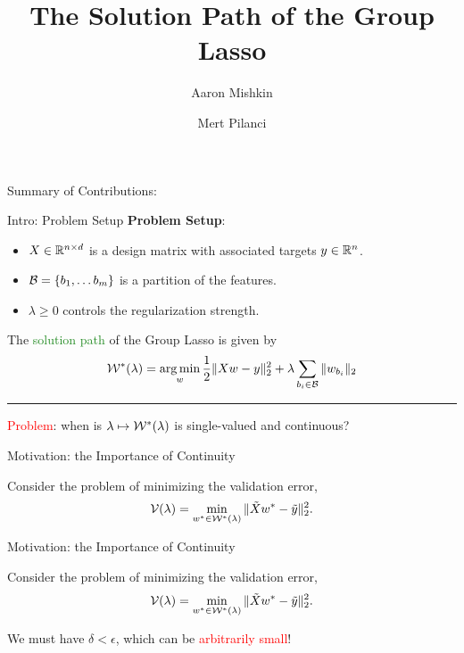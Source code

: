 \documentclass[usenames,dvipsnames,mathserif,notheorems]{beamer}
\title{The Solution Path of the Group Lasso}
\subtitle{}
\author{Aaron Mishkin \and Mert Pilanci}
\institute{Stanford University}
\date{}
\newcommand{\horizontalrule}{
	{
			\vspace{-0.5em}
			\center \rule{\textwidth}{0.1em}
			\vspace{-0.2em}
		}
}
\newcommand{\red}[1]{\textcolor{Red}{#1}}
\newcommand{\green}[1]{\textcolor{ForestGreen}{#1}}
\begin{document}
\maketitle

\begin{frame}{Summary of Contributions:}

\end{frame}


\begin{frame}{Intro: Problem Setup}
	\textbf{Problem Setup}:
	\begin{itemize}
		\item \( X \in \mathbb{R}^{n \times d} \) is a design matrix with associated targets \( y \in \mathbb{R}^n \).
		\item \( \mathcal{B} = \left\{b_1, \ldots b_m\right\} \) is a partition of the features.
		\item \( \lambda \geq 0 \) controls the regularization strength.
	\end{itemize}

	\vspace{0.5em}
	\pause

	The \green{solution path} of the Group Lasso is given by
	\[
		\mathcal{W}^*(\lambda) = \mathop{\rm arg\,min}_{w} \frac 1 2 \|X w - y\|_2^2 + \lambda \sum_{{b_i} \in \mathcal{B}} \|w_{b_i}\|_2
	\]

	\horizontalrule
	\pause

	\red{Problem}: when is \( \lambda \mapsto \mathcal{W}^*(\lambda) \) is single-valued and continuous?

\end{frame}


\begin{frame}{Motivation: the Importance of Continuity}

	Consider the problem of minimizing the validation error,
	\[
		\mathcal{V}(\lambda) = \min_{w^* \in \mathcal{W}^*(\lambda)} \|\tilde X w^* - \tilde y\|_2^2.
	\]

	\pause

	\begin{figure}[]
		\centering
		
	\end{figure}

\end{frame}

\begin{frame}{Motivation: the Importance of Continuity}

	Consider the problem of minimizing the validation error,
	\[
		\mathcal{V}(\lambda) = \min_{w^* \in \mathcal{W}^*(\lambda)} \|\tilde X w^* - \tilde y\|_2^2.
	\]

	\begin{figure}[]
		\centering
		
	\end{figure}

	\pause
	We must have \( \delta < \epsilon \),
	which can be \red{arbitrarily small}!

\end{frame}
\end{document}
